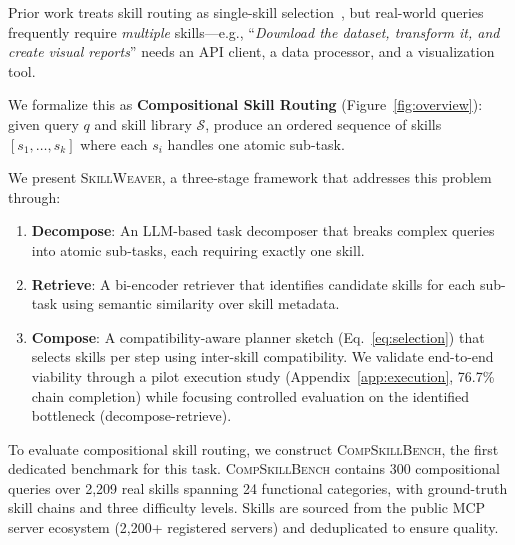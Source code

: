 \documentclass[11pt]{article}
\newcommand{\system}{\textsc{SkillWeaver}}
\newcommand{\benchmark}{\textsc{CompSkillBench}}
\begin{document}
Prior work treats skill routing as single-skill selection~\cite{xu2025skillrouter}, but real-world queries frequently require \emph{multiple} skills---e.g., ``\textit{Download the dataset, transform it, and create visual reports}'' needs an API client, a data processor, and a visualization tool.

We formalize this as \textbf{Compositional Skill Routing} (Figure~\ref{fig:overview}): given query $q$ and skill library $\mathcal{S}$, produce an ordered sequence of skills $[s_1, \ldots, s_k]$ where each $s_i$ handles one atomic sub-task.

We present \system{}, a three-stage framework that addresses this problem through:
\begin{enumerate}[nosep,leftmargin=*]
  \item \textbf{Decompose}: An LLM-based task decomposer that breaks complex queries into atomic sub-tasks, each requiring exactly one skill.
  \item \textbf{Retrieve}: A bi-encoder retriever that identifies candidate skills for each sub-task using semantic similarity over skill metadata.
  \item \textbf{Compose}: A compatibility-aware planner sketch (Eq.~\ref{eq:selection}) that selects skills per step using inter-skill compatibility. We validate end-to-end viability through a pilot execution study (Appendix~\ref{app:execution}, 76.7\% chain completion) while focusing controlled evaluation on the identified bottleneck (decompose-retrieve).
\end{enumerate}

To evaluate compositional skill routing, we construct \benchmark{}, the first dedicated benchmark for this task.
\benchmark{} contains 300 compositional queries over 2{,}209 real skills spanning 24 functional categories, with ground-truth skill chains and three difficulty levels.
Skills are sourced from the public MCP server ecosystem (2,200+ registered servers) and deduplicated to ensure quality.
\end{document}
